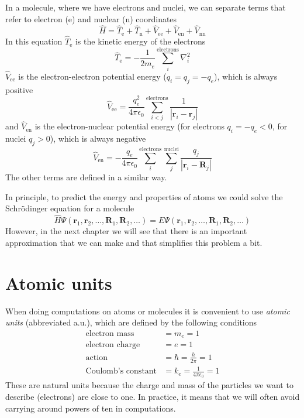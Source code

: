 \documentclass[../Main/notes.tex]{subfiles}
\begin{document}
In a molecule, where we have electrons and nuclei, we can separate terms that refer to electron (e) and nuclear (n) coordinates
\begin{equation}
\hat{H} = \hat{T}_\mathrm{e} + \hat{T}_\mathrm{n} +  \hat{V}_\mathrm{ee} + \hat{V}_\mathrm{en} + \hat{V}_\mathrm{nn}
\end{equation}
In this equation $\hat{T}_\mathrm{e}$ is the kinetic energy of the electrons
\begin{equation}
\hat{T}_\mathrm{e} = -\frac{1}{2 m_e}  \sum_{i}^{\mathrm{electrons}}\nabla^2_i
\end{equation}
$\hat{V}_\mathrm{ee}$ is the electron-electron potential energy ($q_i = q_j = - q_e$), which is always positive
\begin{equation}
\hat{V}_\mathrm{ee} = \frac{q_e^2}{4\pi \epsilon_0}  \sum_{i < j}^{\mathrm{electrons}} \frac{1}{|\mathbf{r}_{i} - \mathbf{r}_{j}|}
\end{equation}
and $\hat{V}_\mathrm{en}$ is the electron-nuclear potential energy (for electrons $q_i = -q_e < 0$, for nuclei $q_j > 0$), which is always negative
\begin{equation}
\hat{V}_\mathrm{en} = - \frac{q_e}{4\pi \epsilon_0}  \sum_{i}^{\mathrm{electrons}}  \sum_{j}^{\mathrm{nuclei}} \frac{q_j}{|\mathbf{r}_{i} - \mathbf{R}_{j}|}
\end{equation}
The other terms are defined in a similar way.

In principle, to predict the energy and properties of atoms we could solve the Schr\"{o}dinger equation for a molecule
\begin{equation}
\hat{H} \Psi(\mathbf{r}_1, \mathbf{r}_2, \ldots, \mathbf{R}_1,  \mathbf{R}_2,\ldots) = E \Psi(\mathbf{r}_1, \mathbf{r}_2, \ldots, \mathbf{R}_1,  \mathbf{R}_2,\ldots)
\end{equation}
However, in the next chapter we will see that there is an important approximation that we can make and that simplifies this problem a bit.

\section{Atomic units}
When doing computations on atoms or molecules it is convenient to use \emph{atomic units} (abbreviated a.u.), which are defined by the following conditions
\begin{align}
\text{electron mass} & = m_e = 1\\
\text{electron charge} & = e = 1\\
\text{action} & = \hbar = \frac{h}{2\pi} = 1\\
\text{Coulomb's constant} & = k_e = \frac{1}{4\pi \epsilon_0} = 1
\end{align}
These are natural units because the charge and mass of the particles we want to describe (electrons) are close to one.
In practice, it means that we will often avoid carrying around powers of ten in computations.
\end{document}
